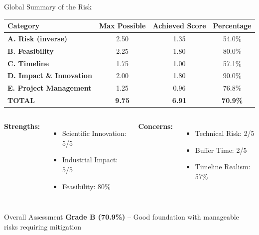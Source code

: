 \documentclass[aspectratio=169]{beamer}
\begin{document}
\begin{frame}{Global Summary of the Risk}
\vspace{-0.6cm}
\begin{center}
\begin{tabular}{|l|c|c|c|}
\hline
\rowcolor{primary!20}
\textbf{Category} & \textbf{Max Possible} & \textbf{Achieved Score} & \textbf{Percentage} \\
\hline
\textbf{A. Risk (inverse)} & 2.50 & 1.35 & \cellcolor{riskhigh}54.0\% \\
\hline
\textbf{B. Feasibility} & 2.25 & 1.80 & \cellcolor{risklow}80.0\% \\
\hline
\textbf{C. Timeline} & 1.75 & 1.00 & \cellcolor{riskhigh}57.1\% \\
\hline
\textbf{D. Impact \& Innovation} & 2.00 & 1.80 & \cellcolor{risklow}90.0\% \\
\hline
\textbf{E. Project Management} & 1.25 & 0.96 & \cellcolor{riskmed}76.8\% \\
\hline
\rowcolor{primary!30}
\textbf{TOTAL} & \textbf{9.75} & \textbf{6.91} & \textbf{70.9\%} \\
\hline
\end{tabular}
\end{center}

\vspace{0.3cm}

\begin{columns}[T]
\textbf{Strengths:}
\begin{itemize}
    \scriptsize
    \item Scientific Innovation: 5/5
    \item Industrial Impact: 5/5
    \item Feasibility: 80\%
\end{itemize}

\textbf{Concerns:}
\begin{itemize}
    \scriptsize
    \item Technical Risk: 2/5
    \item Buffer Time: 2/5
    \item Timeline Realism: 57\%
\end{itemize}
\end{columns}

\vspace{0.2cm}
\begin{alertblock}{Overall Assessment}
\centering
\textbf{Grade B (70.9\%)} -- Good foundation with manageable risks requiring mitigation
\end{alertblock}

\end{frame}
\end{document}
